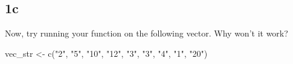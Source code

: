 \documentclass[
]{article}
\newenvironment{Shaded}{\begin{snugshade}}{\end{snugshade}}
\newcommand{\FunctionTok}[1]{\textcolor[rgb]{0.00,0.00,0.00}{#1}}
\newcommand{\NormalTok}[1]{#1}
\newcommand{\OtherTok}[1]{\textcolor[rgb]{0.56,0.35,0.01}{#1}}
\newcommand{\StringTok}[1]{\textcolor[rgb]{0.31,0.60,0.02}{#1}}
\begin{document}
\hypertarget{c-3}{%
\subsection{1c}\label{c-3}}

Now, try running your function on the following vector. Why won't it
work?

\begin{Shaded}
\begin{Highlighting}[]
\NormalTok{vec\_str }\OtherTok{\textless{}{-}} \FunctionTok{c}\NormalTok{(}\StringTok{"2"}\NormalTok{, }\StringTok{"5"}\NormalTok{, }\StringTok{"10"}\NormalTok{, }\StringTok{"12"}\NormalTok{, }\StringTok{"3"}\NormalTok{, }\StringTok{"3"}\NormalTok{, }\StringTok{"4"}\NormalTok{, }\StringTok{"1"}\NormalTok{, }\StringTok{"20"}\NormalTok{)}
\end{Highlighting}
\end{Shaded}
\end{document}
